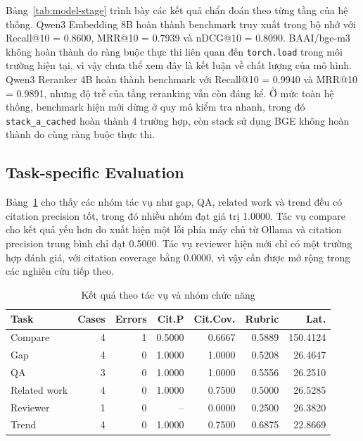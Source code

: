 \documentclass[conference]{IEEEtran}
\begin{document}
Bảng~\ref{tab:model-stage} trình bày các kết quả chẩn đoán theo từng tầng của hệ thống. Qwen3 Embedding 8B hoàn thành benchmark truy xuất trong bộ nhớ với Recall@10 = 0.8600, MRR@10 = 0.7939 và nDCG@10 = 0.8090. BAAI/bge-m3 không hoàn thành do ràng buộc thực thi liên quan đến \texttt{torch.load} trong môi trường hiện tại, vì vậy chưa thể xem đây là kết luận về chất lượng của mô hình. Qwen3 Reranker 4B hoàn thành benchmark với Recall@10 = 0.9940 và MRR@10 = 0.9891, nhưng độ trễ của tầng reranking vẫn còn đáng kể. Ở mức toàn hệ thống, benchmark hiện mới dừng ở quy mô kiểm tra nhanh, trong đó \texttt{stack\_a\_cached} hoàn thành 4 trường hợp, còn stack sử dụng BGE không hoàn thành do cùng ràng buộc thực thi.

\subsection{Task-specific Evaluation}

Bảng~\ref{tab:task-specific} cho thấy các nhóm tác vụ như gap, QA, related work và trend đều có citation precision tốt, trong đó nhiều nhóm đạt giá trị 1.0000. Tác vụ compare cho kết quả yếu hơn do xuất hiện một lỗi phía máy chủ từ Ollama và citation precision trung bình chỉ đạt 0.5000. Tác vụ reviewer hiện mới chỉ có một trường hợp đánh giá, với citation coverage bằng 0.0000, vì vậy cần được mở rộng trong các nghiên cứu tiếp theo.

\begin{table}[t]
\caption{Kết quả theo tác vụ và nhóm chức năng}
\label{tab:task-specific}
\centering
\setlength{\tabcolsep}{2pt}
\begin{tabular}{lrrrrrr}
\toprule
\textbf{Task} & \textbf{Cases} & \textbf{Errors} & \textbf{Cit.P} & \textbf{Cit.Cov.} & \textbf{Rubric} & \textbf{Lat.}\\
\midrule
Compare & 4 & 1 & 0.5000 & 0.6667 & 0.5889 & 150.4124\\
Gap & 4 & 0 & 1.0000 & 1.0000 & 0.5208 & 26.4647\\
QA & 3 & 0 & 1.0000 & 1.0000 & 0.5556 & 26.2510\\
Related work & 4 & 0 & 1.0000 & 0.7500 & 0.5000 & 26.5285\\
Reviewer & 1 & 0 & -- & 0.0000 & 0.2500 & 26.3820\\
Trend & 4 & 0 & 1.0000 & 0.7500 & 0.6875 & 22.8669\\
\bottomrule
\end{tabular}
\end{table}
\end{document}
